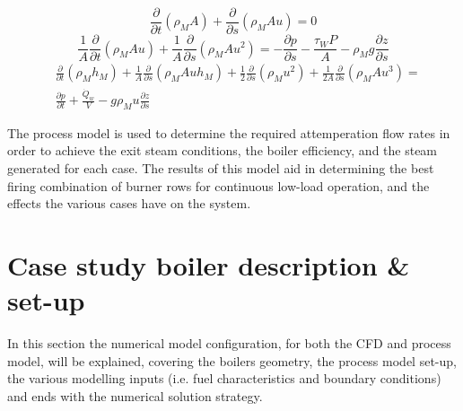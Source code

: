 \documentclass[review]{elsarticle}
\begin{document}
\begin{equation}\label{eqn_mix_conti}
\frac{\partial}{\partial t}(\rho_M A)+\frac{\partial}{\partial s}(\rho_MAu) = 0
\end{equation}
\begin{equation}\label{eqn_mix_mom}
\frac{1}{A} \frac{\partial}{\partial t}(\rho_M A u)+\frac{1}{A} \frac{\partial}{\partial s}(\rho_M A u^2) = -\frac{\partial p}{\partial s}-\frac{\tau_W P}{A}- \rho_M g \frac{\partial z}{\partial s}
\end{equation}
\begin{equation}\label{eqn_mix_energy}
\begin{split}
&\frac{\partial}{\partial t}(\rho_Mh_M)+\frac{1}{A}\frac{\partial}{\partial s}(\rho_MAuh_M)+\frac{1}{2}\frac{\partial}{\partial s}(\rho_Mu^2)+\frac{1}{2A}\frac{\partial}{\partial s}(\rho_MAu^3)=\\&\frac{\partial p}{\partial t} + \frac{\dot{Q}_w}{V}-g\rho_Mu\frac{\partial z}{\partial s}
\end{split}
\end{equation}

The process model is used to determine the required attemperation flow rates in order to achieve the exit steam conditions, the boiler efficiency, and the steam generated for each case. The results of this model aid in determining the best firing combination of burner rows for continuous low-load operation, and the effects the various cases have on the system.

\section{Case study boiler description \& set-up}
In this section the numerical model configuration, for both the CFD and process model, will be explained, covering the boilers geometry, the process model set-up, the various  modelling inputs (i.e. fuel characteristics and boundary conditions) and ends with the numerical solution strategy.
\end{document}
